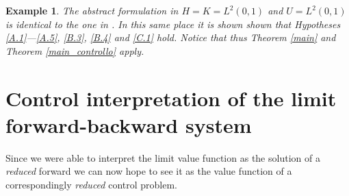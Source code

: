 \documentclass[reqno,a4paper,11 pt]{article}
\newtheorem{example}[theorem]{Example}
\numberwithin{equation}{section}
\begin{document}
\begin{example}
{The abstract formulation in $H=K=L^2(0,1)$ and $U=  L^2(0,1)$ is identical to the one in  \cite[section 5]{FuTes_BE}. In this same place  it is shown shown that Hypotheses  \ref{A.1}---\ref{A.5}, \ref{B.3}, \ref{B.4} and \ref{C.1} hold. Notice that  thus Theorem \ref{main} and Theorem \ref{main_controllo} apply.} 
\end{example}

\section{Control interpretation of the limit forward-backward system}
Since we were able to interpret the limit value function as the solution of a \textit{reduced} forward we can now hope to see it as the value function of a correspondingly 
 \textit{reduced} control problem.

\medskip
 
\end{document}
